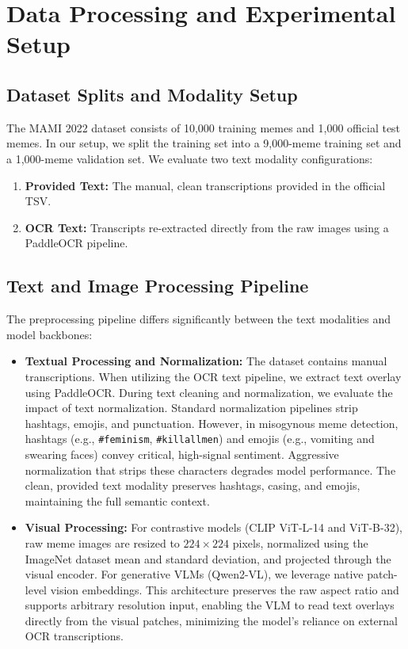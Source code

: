 \documentclass[11pt]{article}
\begin{document}
\section{Data Processing and Experimental Setup}
\label{sec:setup}

\subsection{Dataset Splits and Modality Setup}
The MAMI 2022 dataset consists of 10,000 training memes and 1,000 official test memes. In our setup, we split the training set into a 9,000-meme training set and a 1,000-meme validation set. We evaluate two text modality configurations:
\begin{enumerate}
    \item \textbf{Provided Text:} The manual, clean transcriptions provided in the official TSV.
    \item \textbf{OCR Text:} Transcripts re-extracted directly from the raw images using a PaddleOCR pipeline.
\end{enumerate}

\subsection{Text and Image Processing Pipeline}
\label{subsec:preprocessing}
The preprocessing pipeline differs significantly between the text modalities and model backbones:
\begin{itemize}
    \item \textbf{Textual Processing and Normalization:} The dataset contains manual transcriptions. When utilizing the OCR text pipeline, we extract text overlay using PaddleOCR. During text cleaning and normalization, we evaluate the impact of text normalization. Standard normalization pipelines strip hashtags, emojis, and punctuation. However, in misogynous meme detection, hashtags (e.g., \texttt{\#feminism}, \texttt{\#killallmen}) and emojis (e.g., vomiting and swearing faces) convey critical, high-signal sentiment. Aggressive normalization that strips these characters degrades model performance. The clean, provided text modality preserves hashtags, casing, and emojis, maintaining the full semantic context.
    \item \textbf{Visual Processing:} For contrastive models (CLIP ViT-L-14 and ViT-B-32), raw meme images are resized to $224 \times 224$ pixels, normalized using the ImageNet dataset mean and standard deviation, and projected through the visual encoder. For generative VLMs (Qwen2-VL), we leverage native patch-level vision embeddings. This architecture preserves the raw aspect ratio and supports arbitrary resolution input, enabling the VLM to read text overlays directly from the visual patches, minimizing the model's reliance on external OCR transcriptions.
\end{itemize}
\end{document}
